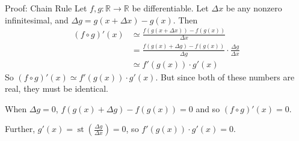 \documentclass{beamer}
\theoremstyle{plain}
\theoremstyle{definition}
\newcommand{\stp}[1]{\st\left(#1\right)}
\newcommand{\reals}{\mathbb{R}}
\DeclareMathOperator{\st}{st}
\begin{document}
\begin{frame}{Proof: Chain Rule}
Let $f,g: \reals \to \reals$ be differentiable. Let $\Delta x$ be any nonzero infinitesimal, and $\Delta g = g(x + \Delta x) - g(x)$. Then
\begin{align*}
(f \circ g)'(x) &\simeq \frac{f(g(x + \Delta x)) - f(g(x))}{\Delta x}  \\
	&= \frac{f(g(x) + \Delta g) - f(g(x))}{\Delta g} \cdot \frac{\Delta g}{\Delta x} \\ 
	&\simeq f'(g(x))\cdot g'(x)
\end{align*}
So $(f \circ g)'(x) \simeq f'(g(x)) \cdot g'(x)$. But since both of these numbers are real, they must be identical.
\vspace{2mm}

When $\Delta g = 0$, $f(g(x) + \Delta g) - f(g(x)) = 0$ and so $(f \circ g)'(x) = 0$. 
\vspace{1mm}

Further, $g'(x) = \stp{\frac{\Delta g}{\Delta x}} = 0$, so $f'(g(x)) \cdot g'(x) = 0$.
\end{frame}
\end{document}
